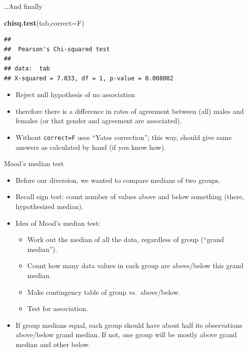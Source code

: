\documentclass[ignorenonframetext,]{beamer}
\newenvironment{Shaded}{\begin{snugshade}}{\end{snugshade}}
\newcommand{\DataTypeTok}[1]{\textcolor[rgb]{0.13,0.29,0.53}{#1}}
\newcommand{\KeywordTok}[1]{\textcolor[rgb]{0.13,0.29,0.53}{\textbf{#1}}}
\newcommand{\NormalTok}[1]{#1}
\providecommand{\tightlist}{%
  \setlength{\itemsep}{0pt}\setlength{\parskip}{0pt}}
\begin{document}
\begin{frame}[fragile]{\ldots{}And finally}
\protect\hypertarget{and-finally}{}

\begin{Shaded}
\begin{Highlighting}[]
\KeywordTok{chisq.test}\NormalTok{(tab,}\DataTypeTok{correct=}\NormalTok{F)}
\end{Highlighting}
\end{Shaded}

\begin{verbatim}
## 
##  Pearson's Chi-squared test
## 
## data:  tab
## X-squared = 7.033, df = 1, p-value = 0.008002
\end{verbatim}

\begin{itemize}
\tightlist
\item
  Reject null hypothesis of no association
\item
  therefore there is a difference in rates of agreement between (all)
  males and females (or that gender and agreement are associated).
\item
  Without \texttt{correct=F} uses ``Yates correction''; this way, should
  give same answers as calculated by hand (if you know how).
\end{itemize}

\end{frame}

\begin{frame}{Mood's median test}
\protect\hypertarget{moods-median-test}{}

\begin{itemize}
\tightlist
\item
  Before our diversion, we wanted to compare medians of two groups.
\item
  Recall sign test: count number of values above and below something
  (there, hypothesized median).
\item
  Idea of Mood's median test:

  \begin{itemize}
  \tightlist
  \item
    Work out the median of all the data, regardless of group (``grand
    median'').
  \item
    Count how many data values in each group are above/below this grand
    median.
  \item
    Make contingency table of group vs.~above/below.
  \item
    Test for association.
  \end{itemize}
\item
  If group medians equal, each group should have about half its
  observations above/below grand median. If not, one group will be
  mostly above grand median and other below.
\end{itemize}

\end{frame}
\end{document}

